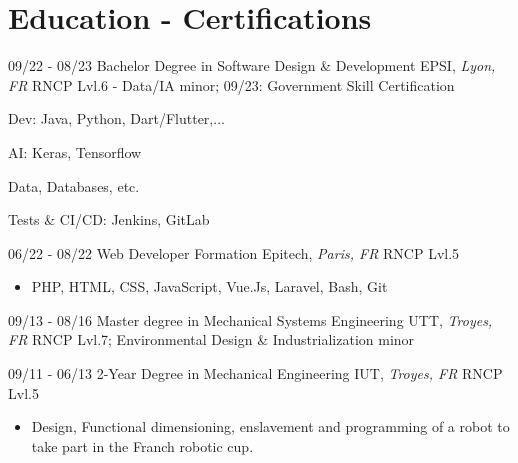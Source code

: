\documentclass[]{friggeri-cv}
\begin{document}
\vspace*{-0.5cm}
\vspace*{0.45cm}
\section{Education - Certifications}
\vspace*{-0.25cm}
\vspace{0.5mm}
\begin{entrylist}
  \entry
    {09/22 - 08/23}
    {Bachelor Degree in Software Design \& Development}
    {EPSI, \textit{Lyon, FR}}
    {RNCP Lvl.6 - Data/IA minor; \hspace{7mm} 09/23: Government Skill Certification}
\end{entrylist}
\vspace*{-0.65cm}
\begin{itemize}
\setlength{\itemsep}{1pt}
\setlength{\parskip}{0pt}
\setlength{\parsep}{0pt}
\begin{multicols}{2}
\item Dev: Java, Python, Dart/Flutter,...
\item AI: Keras, Tensorflow
\columnbreak
\item Data, Databases, etc.
\item Tests \& CI/CD: Jenkins, GitLab
\end{multicols}
\end{itemize}\vspace{0.5mm}
\begin{entrylist}
  \entry
    {06/22 - 08/22}
    {Web Developer Formation}
    {Epitech, \textit{Paris, FR}}
    {RNCP Lvl.5}
\end{entrylist}

\vspace*{-0.35cm}
\begin{itemize}
\setlength{\itemsep}{1pt}
\setlength{\parskip}{0pt}
\setlength{\parsep}{0pt}

\item PHP, HTML, CSS, JavaScript, Vue.Js, Laravel, Bash, Git
\end{itemize}\vspace{0.5mm}
\begin{entrylist}
  \entry
    {09/13 - 08/16}
    {Master degree in Mechanical Systems Engineering}
    {UTT, \textit{Troyes, FR}}
    {RNCP Lvl.7; Environmental Design \& Industrialization minor}
\end{entrylist}
\vspace{0.5mm}
\begin{entrylist}
  \entry
    {09/11 - 06/13}
    {2-Year Degree in Mechanical Engineering}
    {IUT, \textit{Troyes, FR}}
    {RNCP Lvl.5}
\end{entrylist}
\vspace*{-0.4cm}
\begin{itemize}
\setlength{\itemsep}{1pt}
\setlength{\parskip}{0pt}
\setlength{\parsep}{0pt}
\item Design, Functional dimensioning, enslavement and programming of a robot to take part in the Franch robotic cup.
\end{itemize}
\end{document}
